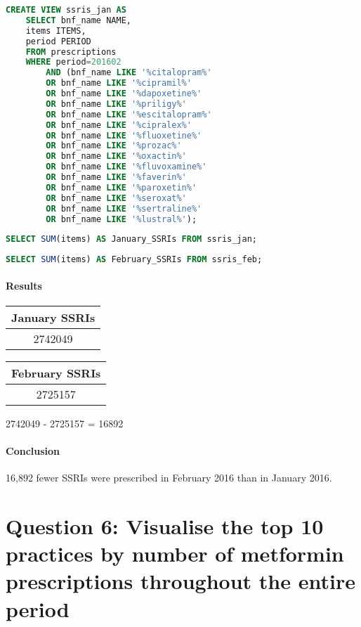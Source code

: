 \documentclass{report}
\begin{document}
\begin{lstlisting}[language=SQL, caption=Question 5 - creating view for February SSRIs]
CREATE VIEW ssris_jan AS 
	SELECT bnf_name NAME, 
	items ITEMS, 
	period PERIOD 
	FROM prescriptions 
	WHERE period=201602
		AND (bnf_name LIKE '%citalopram%' 
		OR bnf_name LIKE '%cipramil%' 
		OR bnf_name LIKE '%dapoxetine%' 
		OR bnf_name LIKE '%priligy%' 
		OR bnf_name LIKE '%escitalopram%' 
		OR bnf_name LIKE '%cipralex%' 
		OR bnf_name LIKE '%fluoxetine%' 
		OR bnf_name LIKE '%prozac%' 
		OR bnf_name LIKE '%oxactin%' 
		OR bnf_name LIKE '%fluvoxamine%' 
		OR bnf_name LIKE '%faverin%' 
		OR bnf_name LIKE '%paroxetin%' 
		OR bnf_name LIKE '%seroxat%' 
		OR bnf_name LIKE '%sertraline%' 
		OR bnf_name LIKE '%lustral%');
\end{lstlisting}
\begin{lstlisting}[language=SQL, caption=Question 5 - finding SSRIs prescribed in January]
SELECT SUM(items) AS January_SSRIs FROM ssris_jan;
\end{lstlisting}
\begin{lstlisting}[language=SQL, caption=Question 5 - finding SSRIs prescribed in February]
SELECT SUM(items) AS February_SSRIs FROM ssris_feb;
\end{lstlisting}
\paragraph{Results}
\begin{center}
\begin{tabular}{ | c | }
\hline
January SSRIs \\
\hline
2742049\\
\hline
\end{tabular}
\end{center}

\begin{center}
\begin{tabular}{ | c | }
\hline
February SSRIs \\
\hline
2725157 \\
\hline
\end{tabular}
\end{center}

2742049 - 2725157 = 16892
\paragraph{Conclusion}
16,892 fewer SSRIs were prescribed in February 2016 than in January 2016.

\section{Question 6: Visualise the top 10 practices by number of metformin prescriptions throughout the entire period}
\end{document}

